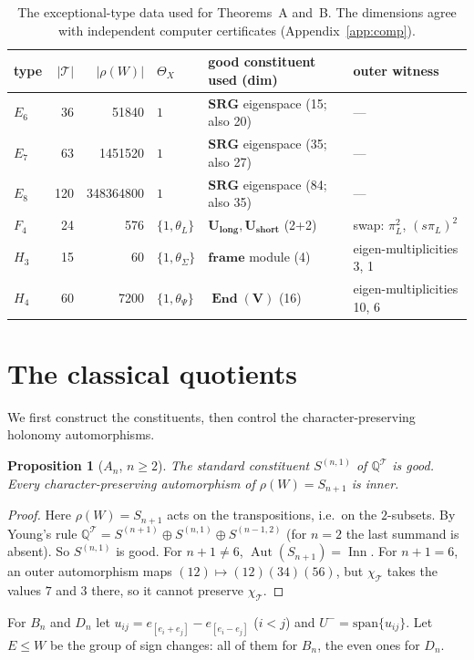 \documentclass[11pt]{amsart}
\newtheorem{proposition}[theorem]{Proposition}
\theoremstyle{definition}
\newcommand{\Q}{\mathbb{Q}}
\newcommand{\T}{\mathcal{T}}
\newcommand{\Aut}{\operatorname{Aut}}
\newcommand{\Inn}{\operatorname{Inn}}
\newcommand{\End}{\operatorname{End}}
\begin{document}
\begin{table}[ht]\centering\small
\begin{tabular}{lrrlll}
\toprule
type & $|\T|$ & $|\rho(W)|$ & $\Theta_X$ & good constituent used (dim) & outer witness\\
\midrule
$E_6$ & 36 & 51840 & $1$ & $\mathbf{SRG}$ eigenspace (15; also 20) & ---\\
$E_7$ & 63 & 1451520 & $1$ & $\mathbf{SRG}$ eigenspace (35; also 27) & ---\\
$E_8$ & 120 & 348364800 & $1$ & $\mathbf{SRG}$ eigenspace (84; also 35) & ---\\
$F_4$ & 24 & 576 & $\{1,\theta_L\}$ & $\mathbf{U_{long}},\mathbf{U_{short}}$ (2+2) & swap: $\pi_L^2$, $(s\pi_L)^2$\\
$H_3$ & 15 & 60 & $\{1,\theta_\Sigma\}$ & $\mathbf{frame}$ module (4) & eigen-multiplicities 3, 1\\
$H_4$ & 60 & 7200 & $\{1,\theta_\Psi\}$ & $\mathbf{\End(V)}$ (16) & eigen-multiplicities 10, 6\\
\bottomrule
\end{tabular}
\caption{The exceptional-type data used for Theorems~A and~B. The dimensions agree with independent computer certificates
(Appendix~\ref{app:comp}).}
\end{table}

\section{The classical quotients}\label{sec:classical}

We first construct the constituents, then control the character-preserving holonomy automorphisms.

\begin{proposition}[$A_n$, $n\ge2$]\label{prop:An}
The standard constituent $S^{(n,1)}$ of $\Q^\T$ is good. Every character-preserving automorphism
of $\rho(W)=S_{n+1}$ is inner.
\end{proposition}
\begin{proof}
Here $\rho(W)=S_{n+1}$ acts on the transpositions, i.e.\ on the $2$-subsets. By Young's rule
$\Q^\T=S^{(n+1)}\oplus S^{(n,1)}\oplus S^{(n-1,2)}$ (for $n=2$ the last summand is absent). So $S^{(n,1)}$ is good.
For $n+1\ne6$, $\Aut(S_{n+1})=\Inn$. For $n+1=6$, an outer automorphism maps $(12)\mapsto(12)(34)(56)$, but
$\chi_\T$ takes the values $7$ and $3$ there, so it cannot preserve $\chi_\T$.
\end{proof}

For $B_n$ and $D_n$ let $u_{ij}=e_{[e_i+e_j]}-e_{[e_i-e_j]}$ ($i<j$) and $U^-=\mathrm{span}\{u_{ij}\}$. Let $E\le W$
be the group of sign changes: all of them for $B_n$, the even ones for $D_n$.
\end{document}
